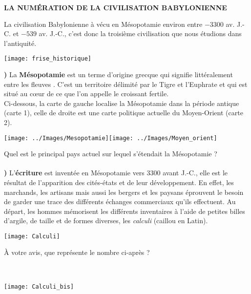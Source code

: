 \documentclass[12pt,a4paper]{article}
\begin{document}
\thispagestyle{empty}


\begin{center}
   \bf LA NUMÉRATION DE LA CIVILISATION BABYLONIENNE \\ [1cm]
\end{center}
   
\noindent La civilisation Babylonienne à vécu en Mésopotamie environ entre $-3300$ av. J.-C. et $-539$ av. J.-C., c'est donc la troisième civilisation que nous étudions dans l'antiquité.

\begin{center}
   \texttt{[image: frise\_historique]}
\end{center}

{\bf{})} La {\bf Mésopotamie} est un terme d’origine grecque qui signifie littéralement \og entre les fleuves \fg. C’est un territoire délimité par le Tigre et l’Euphrate et qui est situé au cœur de ce que l’on appelle le croissant fertile. \\
Ci-dessous, la carte de gauche localise la Mésopotamie dans la période antique (carte 1), celle de droite est une carte politique actuelle du Moyen-Orient (carte 2).
\begin{center}
   \texttt{[image: ../Images/Mesopotamie]}\texttt{[image: ../Images/Moyen\_orient]}
\end{center}
Quel est le principal pays actuel sur lequel s'étendait la Mésopotamie ? \\ [3mm]
\mbox{}  \\

{\bf{})} L’{\bf écriture} est inventée en Mésopotamie vers 3300 avant J.-C., elle est le résultat de l’apparition des cités-états et de leur développement. En effet, les marchands, les artisans mais aussi les bergers et les paysans éprouvent le besoin de garder une trace des différents échanges commerciaux qu’ils effectuent. Au départ, les hommes mémorisent les différents inventaires à l’aide de petites billes d’argile, de taille et de formes diverses, les {\it calculi} (caillou en Latin).

\begin{center}
   \texttt{[image: Calculi]}
\end{center}

\begin{minipage}{9cm}
   À votre avis, que représente le nombre ci-après ? \\ [3mm]
   \mbox{}  \\ [3mm]
   \mbox{}  \\
\end{minipage}
\;
\begin{minipage}{7.5cm}
   \texttt{[image: Calculi\_bis]}
\end{minipage}
\end{document}
